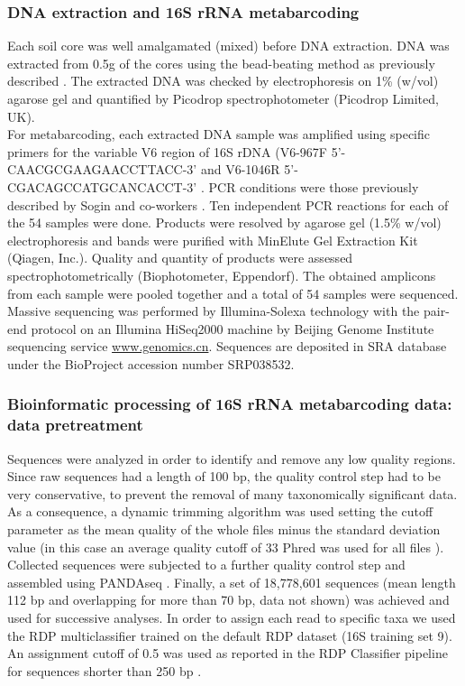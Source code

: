 \subsubsection{DNA extraction and 16S rRNA metabarcoding}
Each soil core was well amalgamated (mixed) before DNA extraction. DNA was extracted from 0.5g of the cores using the bead-beating method as previously described \cite{ascher2009sequential}. The extracted DNA was checked by electrophoresis on 1\% (w/vol) agarose gel and quantified by Picodrop spectrophotometer (Picodrop Limited, UK).\\
For metabarcoding, each extracted DNA sample was amplified using specific primers for the variable V6 region of 16S rDNA (V6-967F 5'-CAA\-CGC\-GAA\-GAA\-CCT\-TAC\-C-3' and V6-1046R 5'-CGA\-CAG\-CCA\-TGC\-ANC\-ACC\-T-3' \cite{huse2008exploring}. PCR conditions were those previously described by Sogin and co-workers \cite{sogin2006microbial}. Ten independent PCR reactions for each of the 54 samples were done. Products were resolved by agarose gel (1.5\% w/vol) electrophoresis and bands were purified with MinElute Gel Extraction Kit (Qiagen, Inc.). Quality and quantity of products were assessed spectrophotometrically (Biophotometer, Eppendorf). The obtained amplicons from each sample were pooled together and a total of 54 samples were sequenced. Massive sequencing was performed by Illumina-Solexa technology \cite{bartram2011generation,gloor2010microbiome} with the pair-end protocol on an Illumina HiSeq2000 machine by Beijing Genome Institute sequencing service \href{www.genomics.cn}{www.\-gen\-omi\-cs.cn}. Sequences are deposited in SRA database under the BioProject accession number SRP038532.\\

\subsubsection{Bioinformatic processing of 16S rRNA metabarcoding data: data pretreatment}
Sequences were analyzed in order to identify and remove any low quality regions. Since raw sequences had a length of 100 bp, the quality control step had to be very conservative, to prevent the removal of many taxonomically significant data. As a consequence, a dynamic trimming algorithm was used \cite{bacci2014streamingtrim} setting the cutoff parameter as the mean quality of the whole files minus the standard deviation value (in this case an average quality cutoff of 33 Phred was used for all files \cite{ewing1998base, ewing1998base}). Collected sequences were subjected to a further quality control step and assembled using PANDAseq \cite{masella2012pandaseq}. Finally, a set of 18,778,601 sequences (mean length 112 bp and overlapping for more than 70 bp, data not shown) was achieved and used for successive analyses. In order to assign each read to specific taxa we used the RDP multiclassifier trained on the default RDP dataset (16S training set 9). An assignment cutoff of 0.5 was used as reported in the RDP Classifier pipeline for sequences shorter than 250 bp \cite{wang2007naive}.\\

